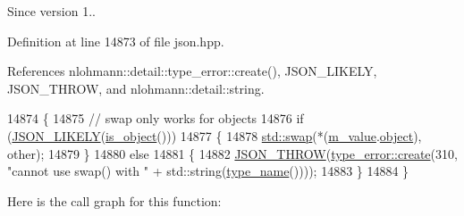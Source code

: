 \begin{DoxySince}{Since}
version 1.. 
\end{DoxySince}


Definition at line 14873 of file json.\+hpp.



References nlohmann\+::detail\+::type\+\_\+error\+::create(), J\+S\+O\+N\+\_\+\+L\+I\+K\+E\+LY, J\+S\+O\+N\+\_\+\+T\+H\+R\+OW, and nlohmann\+::detail\+::string.


\begin{DoxyCode}
14874     \{
14875         \textcolor{comment}{// swap only works for objects}
14876         \textcolor{keywordflow}{if} (\hyperlink{json_8hpp_a41ecd1c4cf7c3d56477b9b685b5daa72}{JSON\_LIKELY}(\hyperlink{classnlohmann_1_1basic__json_af8f511af124e82e4579f444b4175787c}{is\_object}()))
14877         \{
14878             \hyperlink{json_8hpp_a907191b7578e209391ce938e3b2afdf7}{std::swap}(*(\hyperlink{classnlohmann_1_1basic__json_aeb0814f76966f99290cb29e127c90a77}{m\_value}.\hyperlink{unionnlohmann_1_1basic__json_1_1json__value_a4a2209bb26e7088cd36bf24824ab5521}{object}), other);
14879         \}
14880         \textcolor{keywordflow}{else}
14881         \{
14882             \hyperlink{json_8hpp_a6c274f6db2e65c1b66c7d41b06ad690f}{JSON\_THROW}(\hyperlink{classnlohmann_1_1detail_1_1type__error_aecc083aea4b698c33d042670ba50c10f}{type\_error::create}(310, \textcolor{stringliteral}{"cannot use swap() with "} + 
      std::string(\hyperlink{classnlohmann_1_1basic__json_a9d0a478571f82f0163b96b2424cd998f}{type\_name}())));
14883         \}
14884     \}
\end{DoxyCode}
Here is the call graph for this function\+:
\mbox{\label{classnlohmann_1_1basic__json_adaa1ed0a889d86c8e0216a3d66980f76}} 
